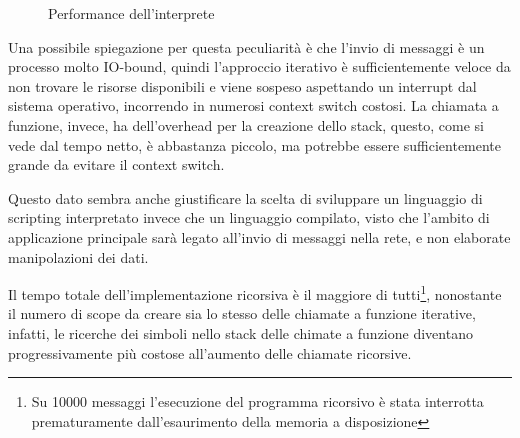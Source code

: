 \documentclass[10pt]{article}
\begin{document}
\begin{figure}
	\centering
	\caption{Performance dell'interprete}
	\label{fig:performance-graph}
\end{figure}

Una possibile spiegazione per questa peculiarità è che l'invio di messaggi è un processo molto IO-bound, quindi l'approccio iterativo è sufficientemente veloce da non trovare le risorse disponibili e viene sospeso aspettando un interrupt dal sistema operativo, incorrendo in numerosi context switch costosi. La chiamata a funzione, invece, ha dell'overhead per la creazione dello stack, questo, come si vede dal tempo netto, è abbastanza piccolo, ma potrebbe essere sufficientemente grande da evitare il context switch.

Questo dato sembra anche giustificare la scelta di sviluppare un linguaggio di scripting interpretato invece che un linguaggio compilato, visto che l'ambito di applicazione principale sarà legato all'invio di messaggi nella rete, e non elaborate manipolazioni dei dati.

Il tempo totale dell'implementazione ricorsiva è il maggiore di tutti\footnote{Su 10000 messaggi l'esecuzione del programma ricorsivo è stata interrotta prematuramente dall'esaurimento della memoria a disposizione}, nonostante il numero di scope da creare sia lo stesso delle chiamate a funzione iterative, infatti, le ricerche dei simboli nello stack delle chimate a funzione diventano progressivamente più costose all'aumento delle chiamate ricorsive.
\end{document}
